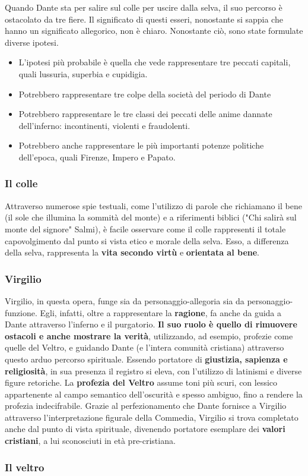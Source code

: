 \documentclass[10pt,a4paper]{article}
\begin{document}
 		Quando Dante sta per salire sul colle per uscire dalla selva, il suo percorso è ostacolato da tre fiere. Il significato di questi esseri, nonostante si sappia che hanno un significato allegorico, non è chiaro. Nonostante ciò, sono state formulate diverse ipotesi. 
 		\begin{itemize}
 			\item L'ipotesi più probabile è quella che vede rappresentare tre peccati capitali, quali lussuria, superbia e cupidigia.
 			\item Potrebbero rappresentare tre colpe della società del periodo di Dante
 			\item Potrebbero rappresentare le tre classi dei peccati delle anime dannate dell'inferno: incontinenti, violenti e fraudolenti.
 			\item Potrebbero anche rappresentare le più importanti potenze politiche dell'epoca, quali Firenze, Impero e Papato.  
 		\end{itemize}
 	
 		\subsubsection{Il colle}
 		
 		Attraverso numerose spie testuali, come l'utilizzo di parole che richiamano il bene (il sole che illumina la sommità del monte) e a riferimenti biblici ("Chi salirà sul monte del signore" Salmi), è facile osservare come il colle rappresenti il totale capovolgimento dal punto si vista etico e morale della selva. Esso, a differenza della selva, rappresenta la \textbf{vita secondo virtù} e \textbf{orientata al bene}.
 		
 		\subsubsection{Virgilio}
 		
		Virgilio, in questa opera, funge sia da personaggio-allegoria sia da personaggio-funzione. Egli, infatti, oltre a rappresentare la \textbf{ragione}, fa anche da guida a Dante attraverso l'inferno e il purgatorio. \textbf{Il suo ruolo è quello di rimuovere ostacoli e anche mostrare la verità}, utilizzando, ad esempio, profezie come quelle del Veltro, e guidando Dante (e l'intera comunità cristiana) attraverso questo arduo percorso spirituale. Essendo portatore di \textbf{giustizia, sapienza e religiosità}, in sua presenza il registro si eleva, con l'utilizzo di latinismi e diverse figure retoriche. La \textbf{profezia del Veltro} assume toni più scuri, con lessico appartenente al campo semantico dell'oscurità e spesso ambiguo, fino a rendere la profezia indecifrabile. Grazie al perfezionamento che Dante fornisce a Virgilio attraverso l'interpretazione figurale della Commedia, Virgilio si trova completato anche dal punto di vista spirituale, divenendo portatore esemplare dei \textbf{valori cristiani}, a lui sconosciuti in età pre-cristiana.
		
		\subsubsection{Il veltro}
		
		
 	
\end{document}
